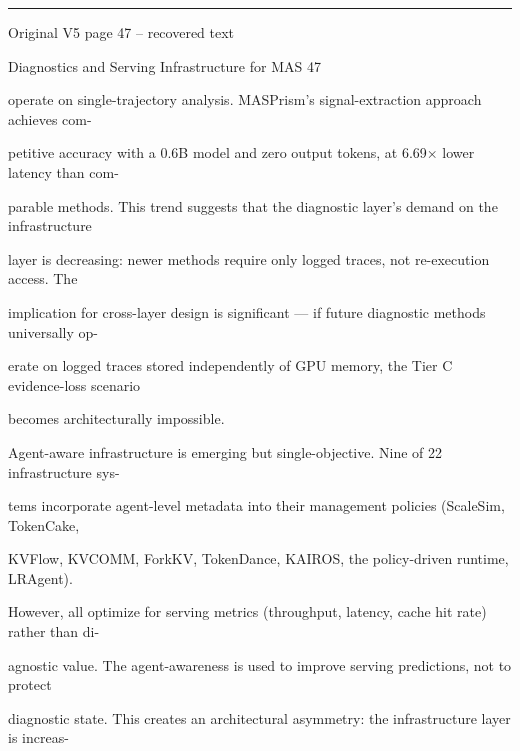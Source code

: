 \par\smallskip\noindent\rule{\textwidth}{0.4pt}\par{\sffamily\footnotesize Original V5 page 47 -- recovered text}\par\begin{flushleft}\footnotesize\ttfamily
\par\smallskip
\par\smallskip
\noindent Diagnostics and Serving Infrastructure for MAS 47\par
\par\smallskip
\par\smallskip
\par\smallskip
{} operate on single-trajectory analysis. MASPrism’s signal-extraction approach achieves com-\par
\noindent petitive accuracy with a 0.6B model and zero output tokens, at 6.69× lower latency than com-\par
\noindent parable methods. This trend suggests that the diagnostic layer’s demand on the infrastructure\par
\noindent layer is decreasing: newer methods require only logged traces, not re-execution access. The\par
\noindent implication for cross-layer design is significant — if future diagnostic methods universally op-\par
\noindent erate on logged traces stored independently of GPU memory, the Tier C evidence-loss scenario\par
\noindent becomes architecturally impossible.\par
\par\smallskip
\noindent Agent-aware infrastructure is emerging but single-objective. Nine of 22 infrastructure sys-\par
\noindent tems incorporate agent-level metadata into their management policies (ScaleSim, TokenCake,\par
\noindent KVFlow, KVCOMM, ForkKV, TokenDance, KAIROS, the policy-driven runtime, LRAgent).\par
\noindent However, all optimize for serving metrics (throughput, latency, cache hit rate) rather than di-\par
\noindent agnostic value. The agent-awareness is used to improve serving predictions, not to protect\par
\noindent diagnostic state. This creates an architectural asymmetry: the infrastructure layer is increas-\par

\end{flushleft}
